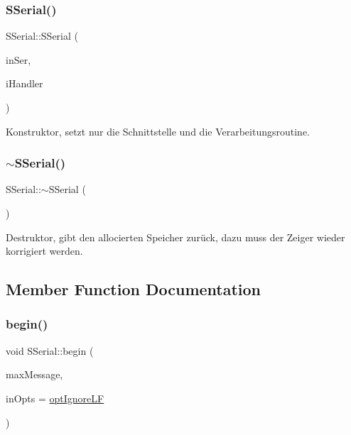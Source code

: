 \subsubsection{\texorpdfstring{S\+Serial()}{SSerial()}}
{\footnotesize\ttfamily S\+Serial\+::\+S\+Serial (\begin{DoxyParamCaption}\item[{Stream \&}]{in\+Ser,  }\item[{\hyperlink{_whandall_serial_8h_a3241d91f371dd5951b01532bce8e7be2}{line\+Process}}]{i\+Handler }\end{DoxyParamCaption})\hspace{0.3cm}{\ttfamily [inline]}}



Konstruktor, setzt nur die Schnittstelle und die Verarbeitungsroutine. 

\mbox{\label{class_s_serial_af153a485fe12aed9f49c4d9fcbd636fd}} 
\subsubsection{\texorpdfstring{$\sim$\+S\+Serial()}{~SSerial()}}
{\footnotesize\ttfamily S\+Serial\+::$\sim$\+S\+Serial (\begin{DoxyParamCaption}{ }\end{DoxyParamCaption})\hspace{0.3cm}{\ttfamily [inline]}}



Destruktor, gibt den allocierten Speicher zurück, dazu muss der Zeiger wieder korrigiert werden. 



\subsection{Member Function Documentation}
\mbox{\label{class_s_serial_ad82361ddb96f50e930af7734086c7ed8}} 
\subsubsection{\texorpdfstring{begin()}{begin()}}
{\footnotesize\ttfamily void S\+Serial\+::begin (\begin{DoxyParamCaption}\item[{uint8\+\_\+t}]{max\+Message,  }\item[{uint8\+\_\+t}]{in\+Opts = {\ttfamily \hyperlink{_whandall_serial_8h_a06fc87d81c62e9abb8790b6e5713c55ba21464d1b8daee38b3531cf82121ce286}{opt\+Ignore\+LF}} }\end{DoxyParamCaption})}



